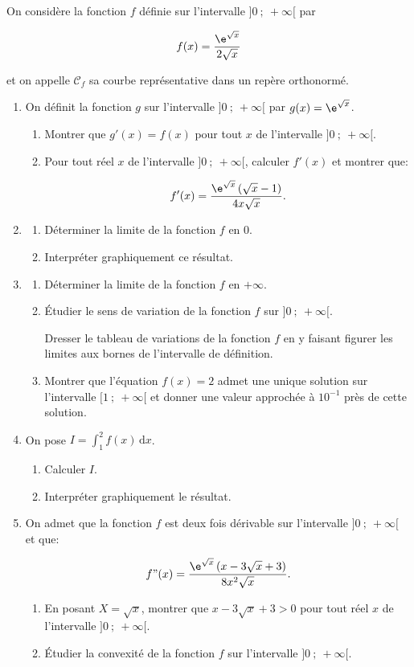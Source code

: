 On considère la fonction $f$ définie sur l'intervalle $]0~;~ + \infty[$ par

\[f(x) = \frac{\e^{\sqrt{x}}}{2\sqrt{x}}\]

et on appelle $\mathcal{C}_f$ sa courbe représentative dans un repère orthonormé.

\medskip

\begin{enumerate}
\item On définit la fonction $g$ sur l'intervalle $]0~;~ + \infty[$ par $g(x) = \e^{\sqrt{x}}$.
	\begin{enumerate}
		\item Montrer que $g'(x) = f(x)$ pour tout $x$ de l'intervalle $]0~;~ + \infty[$.
		\item Pour tout réel $x$ de l'intervalle $]0~;~ + \infty[$, calculer $f'(x)$ et montrer que:

\[f'(x) = \dfrac{\e^{\sqrt{x}}\left(\sqrt x - 1\right)}{4x\sqrt x}.\]
	\end{enumerate}
\item
	\begin{enumerate}
		\item Déterminer la limite de la fonction $f$ en $0$.
		\item Interpréter graphiquement ce résultat.
	\end{enumerate}
\item
	\begin{enumerate}
		\item Déterminer la limite de la fonction $f$ en $+ \infty$.
		\item Étudier le sens de variation de la fonction $f$ sur $]0~;~+ \infty[$.

Dresser le tableau de variations de la fonction $f$ en y faisant figurer les limites aux bornes de l'intervalle de définition.
		\item Montrer que l'équation $f(x) = 2$ admet une unique solution sur l'intervalle $[1~;~+\infty[$ et donner une valeur approchée à $10^{-1}$ près de cette solution.
	\end{enumerate}
\item On pose  $I = \displaystyle\int_1^2 f(x)\, \text{d}x$.
	\begin{enumerate}
		\item Calculer $I$.
		\item Interpréter graphiquement le résultat.
	\end{enumerate}
\item On admet que la fonction $f$ est deux fois dérivable sur l'intervalle $]0~;~ + \infty[$ et que:

\[f"(x) = \dfrac{\e^{\sqrt{x}}\left(x - 3\sqrt x + 3\right)}{8x^2\sqrt x}.\]

	\begin{enumerate}
		\item En posant $X = \sqrt x$, montrer que $x - 3\sqrt x + 3 > 0$ pour tout réel $x$ de l'intervalle $]0~;~ + \infty[$.
		\item Étudier la convexité de la fonction $f$ sur l'intervalle $]0~;~ + \infty[$.
	\end{enumerate}
\end{enumerate}
